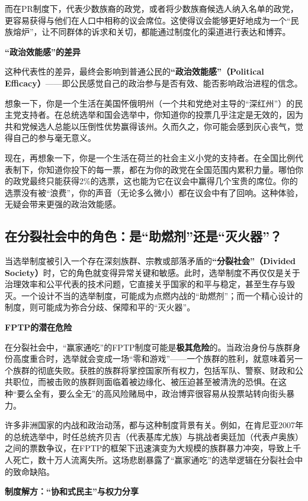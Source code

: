 而在PR制度下，代表少数族裔的政党，或者将少数族裔候选人纳入名单的政党，更容易获得与他们在人口中相称的议会席位。这使得议会能够更好地成为一个“民族熔炉”，让不同群体的诉求和关切，都能通过制度化的渠道进行表达和博弈。

\textbf{“政治效能感”的差异}

这种代表性的差异，最终会影响到普通公民的\textbf{“政治效能感”（Political Efficacy）}——即公民感觉自己的政治参与是否有效、能否影响政治进程的信念。

想象一下，你是一个生活在美国怀俄明州（一个共和党绝对主导的“深红州”）的民主党支持者。在总统选举和国会选举中，你知道你的投票几乎注定是无效的，因为共和党候选人总能以压倒性优势赢得该州。久而久之，你可能会感到灰心丧气，觉得自己的参与毫无意义。

现在，再想象一下，你是一个生活在荷兰的社会主义小党的支持者。在全国比例代表制下，你知道你投下的每一票，都在为你的政党在全国范围内累积力量。哪怕你的政党最终只能获得2\%的选票，这也能为它在议会中赢得几个宝贵的席位。你的选票没有被“浪费”，你的声音（无论多么微小）都在议会中有了回响。这种体验，无疑会带来更强的政治效能感。

\subsection{在分裂社会中的角色：是“助燃剂”还是“灭火器”？}

当选举制度被引入一个存在深刻族群、宗教或部落矛盾的\textbf{“分裂社会”（Divided Society）}时，它的角色就变得异常关键和敏感。此时，选举制度不再仅仅是关于治理效率和公平代表的技术问题，它直接关乎国家的和平与稳定，甚至生存与毁灭。一个设计不当的选举制度，可能成为点燃内战的“助燃剂”；而一个精心设计的制度，则可能成为弥合分歧、保障和平的“灭火器”。

\textbf{FPTP的潜在危险}

在分裂社会中，“赢家通吃”的FPTP制度可能是\textbf{极其危险}的。当政治身份与族群身份高度重合时，选举就会变成一场“零和游戏”——一个族群的胜利，就意味着另一个族群的彻底失败。获胜的族群将掌控国家所有权力，包括军队、警察、财政和公共职位，而被击败的族群则面临着被边缘化、被压迫甚至被清洗的恐惧。在这种“要么全有，要么全无”的高风险赌局中，政治博弈很容易从投票站转向街头暴力。

许多非洲国家的内战和政治动荡，都与这种制度背景有关。例如，在肯尼亚2007年的总统选举中，时任总统齐贝吉（代表基库尤族）与挑战者奥廷加（代表卢奥族）之间的票数争议，在FPTP的框架下迅速演变为大规模的族群暴力冲突，导致上千人死亡，数十万人流离失所。这场悲剧暴露了“赢家通吃”的选举逻辑在分裂社会中的致命缺陷。

\textbf{制度解方：“协和式民主”与权力分享}

